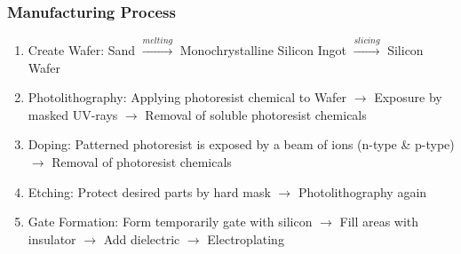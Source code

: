 \documentclass{beamer}
\begin{document}




\begin{frame}\frametitle{Manufacturing Process} 
\begin{overprint}
 \begin{enumerate}
  \item Create Wafer: Sand $\xrightarrow{melting}$ Monochrystalline Silicon Ingot $\xrightarrow{slicing}$ Silicon Wafer
  \item Photolithography: Applying photoresist chemical to Wafer $\rightarrow$ Exposure by masked UV-rays $\rightarrow$ Removal of soluble photoresist chemicals
  \item Doping: Patterned photoresist is exposed by a beam of ions (n-type \& p-type) $\rightarrow$ Removal of photoresist chemicals
  \item Etching: Protect desired parts by hard mask $\rightarrow$ Photolithography again
  \item Gate Formation: Form temporarily gate with silicon $\rightarrow$ Fill areas with insulator $\rightarrow$ Add dielectric $\rightarrow$ Electroplating
 \end{enumerate}
\end{overprint}
\end{frame}
\end{document}
